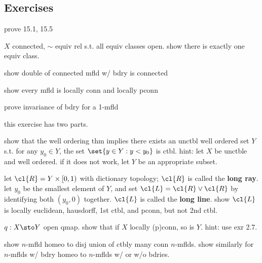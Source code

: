 \subsection{Exercises}

\begin{exr}[source=Primary Source Material]
    prove 15.1, 15.5
\end{exr}

\begin{exr}[source=Primary Source Material]
    $X$ connected, $\sim$ equiv rel s.t. all equiv classes open.
    show there is exactly one equiv class.
\end{exr}

\begin{exr}[source=Primary Source Material]
    show double of connected mfld w/ bdry is connected
\end{exr}

\begin{exr}[source=Primary Source Material]
    show every mfld is locally conn and locally pconn
\end{exr}

\begin{exr}[source=Primary Source Material]
    prove invariance of bdry for a 1-mfld
\end{exr}

\begin{exr}[source=Primary Source Material]
    this exercise has two parts.

    show that the well ordering thm implies there exists an unctbl well ordered
    set $Y$ s.t. for any $y_{0}\in Y$, the set $\set{y\in Y:y<y_{0}}$ is ctbl.
    hint: let $X$ be unctble and well ordered.
    if it does not work, let $Y$ be an appropriate subset.

    let $\cl{R} = Y\times[0,1)$ with dictionary topology;
    $\cl{R}$ is called the \textbf{long ray}.
    let $y_{0}$ be the smallest element of $Y$, and
    set $\cl{L}=\cl{R}\vee\cl{R}$ by identifying both $(y_{0},0)$ together.
    $\cl{L}$ is called the \textbf{long line}.
    show $\cl{L}$ is locally euclidean, hausdorff, 1st ctbl, and pconn, but not
    2nd ctbl.
\end{exr}

\newpage
\begin{exr}[source=Primary Source Material]
    $q:X\sto Y$ open qmap.
    show that if $X$ locally (p)conn, so is $Y$.
    hint: use exr 2.7.
\end{exr}

\begin{exr}[source=Primary Source Material]
    show $n$-mfld homeo to disj union of ctbly many conn $n$-mflds.
    show similarly for $n$-mflds w/ bdry homeo to $n$-mflds w/ or w/o bdries. 
\end{exr}


